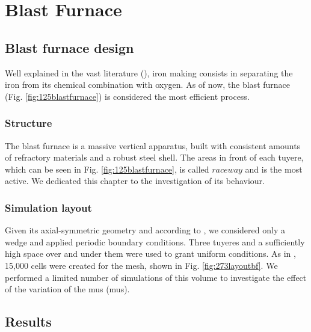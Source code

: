 
\chapter{Blast Furnace}
\label{cap:blastfurnace}

\section{Blast furnace design}
\label{sec:bfdesign}

Well explained in the vast literature (\cite{RefWorks:203}), 
iron making consists in separating the iron from its chemical combination with
oxygen. 
As of now, the blast furnace (Fig. \ref{fig:125blastfurnace}) is considered the
most efficient process.



\subsection{Structure}
\label{subsec:bfstructure}

The blast furnace is a massive vertical apparatus, built with consistent amounts
of refractory materials and a robust steel shell.
The areas in front of each tuyere, which can be seen in Fig.
\ref{fig:125blastfurnace}, is called $raceway$ and is the most active. 
We dedicated this chapter to the investigation of its behaviour.

\subsection{Simulation layout}
\label{subsec:simulationlayout}

Given its axial-symmetric geometry and according to \citet{RefWorks:208}, we
considered only a wedge and applied periodic boundary conditions.
Three tuyeres and a sufficiently high space over and under them were used to
grant uniform conditions.
As in \citet{RefWorks:208}, 15,000 cells were created for the mesh, shown in
Fig. \ref{fig:273layoutbf}. We performed a
limited number of simulations of this volume to investigate the effect of the
variation of the \acl{mus} (\acs{mus}).



\section{Results}
\label{sec:resultsbf}


